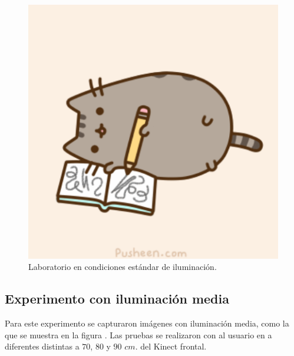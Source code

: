 \begin{figure}[h!]
\begin{center} 
\includegraphics[scale=0.3]{./Figures/pusheen.png}
\end{center}
\caption{Laboratorio en condiciones estándar de iluminación.}
\label{fig:LabIluminado}
\end{figure}


\subsection{Experimento con iluminación media} 
Para este experimento se capturaron imágenes con iluminación media, como la que se muestra en la figura . Las pruebas se realizaron con al usuario en a diferentes distintas a $70$, $80$ y $90$ $cm.$ del Kinect frontal. 

